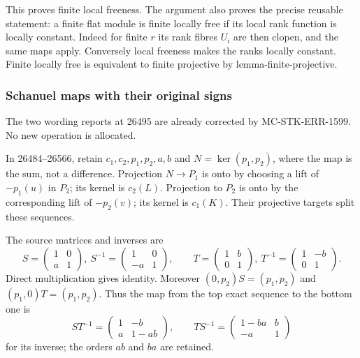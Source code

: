 This proves finite local freeness. The argument also proves the precise reusable statement: a finite flat module is finite locally free if its local rank function is locally constant. Indeed for finite \(r\) its rank fibres \(U_i\) are then clopen, and the same maps apply. Conversely local freeness makes the ranks locally constant. Finite locally free is equivalent to finite projective by lemma-finite-projective.

\subsubsection{Schanuel maps with their original signs}\label{algebra-proof-022-schanuel-maps-with-their-original-signs}

The two wording reports at 26495 are already corrected by MC-STK-ERR-1599. No new operation is allocated.

In 26484--26566, retain \(c_1,c_2,p_1,p_2,a,b\) and \(N=\ker(p_1,p_2)\), where the map is the sum, not a difference. Projection \(N\to P_1\) is onto by choosing a lift of \(-p_1(u)\) in \(P_2\); its kernel is \(c_2(L)\). Projection to \(P_2\) is onto by the corresponding lift of \(-p_2(v)\); its kernel is \(c_1(K)\). Their projective targets split these sequences.

The source matrices and inverses are \[
S=\begin{pmatrix}1&0\\a&1\end{pmatrix},\
S^{-1}=\begin{pmatrix}1&0\\-a&1\end{pmatrix},\qquad
T=\begin{pmatrix}1&b\\0&1\end{pmatrix},\
T^{-1}=\begin{pmatrix}1&-b\\0&1\end{pmatrix}.
\] Direct multiplication gives identity. Moreover \((0,p_2)S=(p_1,p_2)\) and \((p_1,0)T=(p_1,p_2)\). Thus the map from the top exact sequence to the bottom one is \[
ST^{-1}=\begin{pmatrix}1&-b\\a&1-ab\end{pmatrix},
\qquad
TS^{-1}=\begin{pmatrix}1-ba&b\\-a&1\end{pmatrix}
\] for its inverse; the orders \(ab\) and \(ba\) are retained.


